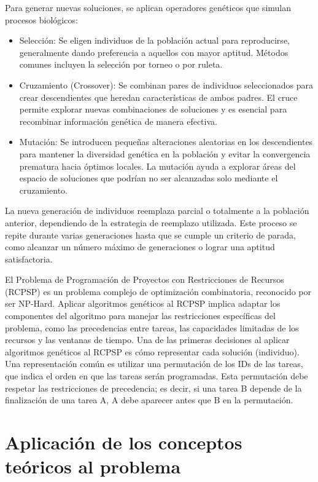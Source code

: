 \documentclass{article}
\begin{document}
Para generar nuevas soluciones, se aplican operadores genéticos que simulan procesos biológicos:
\begin{itemize}
  \item Selección: Se eligen individuos de la población actual para reproducirse, generalmente dando preferencia a aquellos con mayor aptitud. Métodos comunes incluyen la selección por torneo o por ruleta.
  \item Cruzamiento (Crossover): Se combinan pares de individuos seleccionados para crear descendientes que heredan características de ambos padres. El cruce permite explorar nuevas combinaciones de soluciones y es esencial para recombinar información genética de manera efectiva.
  \item Mutación: Se introducen pequeñas alteraciones aleatorias en los descendientes para mantener la diversidad genética en la población y evitar la convergencia prematura hacia óptimos locales. La mutación ayuda a explorar áreas del espacio de soluciones que podrían no ser alcanzadas solo mediante el cruzamiento.
  
\end{itemize}

La nueva generación de individuos reemplaza parcial o totalmente a la población anterior, dependiendo de la estrategia de reemplazo utilizada. Este proceso se repite durante varias generaciones hasta que se cumple un criterio de parada, como alcanzar un número máximo de generaciones o lograr una aptitud satisfactoria.

El Problema de Programación de Proyectos con Restricciones de Recursos (RCPSP) es un problema complejo de optimización combinatoria, reconocido por ser NP-Hard. Aplicar algoritmos genéticos al RCPSP implica adaptar los componentes del algoritmo para manejar las restricciones específicas del problema, como las precedencias entre tareas, las capacidades limitadas de los recursos y las ventanas de tiempo.
Una de las primeras decisiones al aplicar algoritmos genéticos al RCPSP es cómo representar cada solución (individuo). Una representación común es utilizar una permutación de los IDs de las tareas, que indica el orden en que las tareas serán programadas. Esta permutación debe respetar las restricciones de precedencia; es decir, si una tarea B depende de la finalización de una tarea A, A debe aparecer antes que B en la permutación.


\section{Aplicación de los conceptos teóricos al problema}
\end{document}
